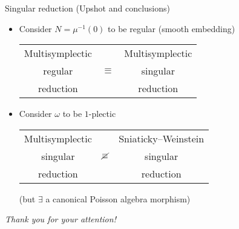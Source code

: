 \documentclass[beamer,10pt]{standalone}
\begin{document}
\begin{frame}{Singular reduction (Upshot and conclusions)}

	\begin{itemize}
		\item Consider $N=\mu^{-1}(0)$ to be regular (smooth embedding)
		\vspace{.5em}
		\begin{table}[]
			\begin{tabular}{ccc}
			Multisymplectic               &                      & Multisymplectic                  \\
			regular                       & $\equiv$             & singular                \\
			reduction & & reduction
			\end{tabular}
		\end{table}	
		
		\pause
		\item
			Consider $\omega$ to be $1$-plectic
			\vspace{.5em}
			\begin{table}[]
				\begin{tabular}{ccc}
				Multisymplectic               &                      &  Sniaticky--Weinstein                  \\
				singular                       & $\cancel\equiv$             & singular                \\
				reduction & & reduction
				\end{tabular}
			\end{table}	

			(but $\exists$ a canonical Poisson algebra morphism)
	\end{itemize}
	
	\pause
			\vfill
		  \centering 
		  {\Huge\color{red} 
		  \emph{Thank you for your attention!}}
			\vfill
\end{frame}
\note[itemize]{
 \item
}
\end{document}

